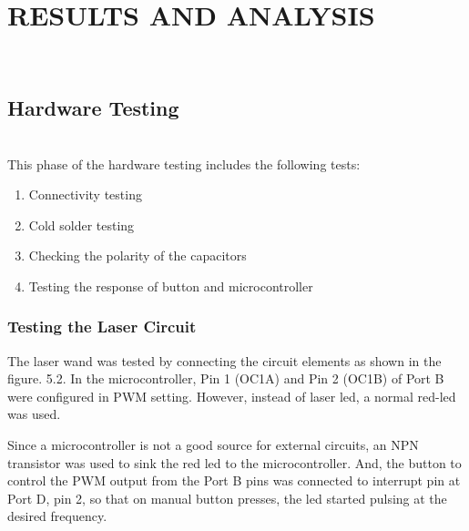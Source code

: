 \documentclass[12pt, a4paper]{article}
\begin{document}
\section{RESULTS AND ANALYSIS}
~\\
\subsection{Hardware Testing}
~\\
This phase of the hardware testing includes the following tests:
\begin{enumerate}
\item Connectivity testing
\item Cold solder testing
\item Checking the polarity of the capacitors
\item Testing the response of button and microcontroller
\end{enumerate}

\subsubsection{Testing the Laser Circuit}

The laser wand was tested by connecting the circuit elements as shown in the figure. 5.2. In the microcontroller, Pin 1 (OC1A) and Pin 2 (OC1B) of Port B were configured in PWM setting. However, instead of laser led, a normal red-led was used. 

Since a microcontroller is not a good source for external circuits, an NPN transistor was used to sink the red led to the microcontroller. And, the button to control the PWM output from the Port B pins was connected to interrupt pin at Port D, pin 2, so that on manual button presses, the led started pulsing at the desired frequency.
\end{document}
